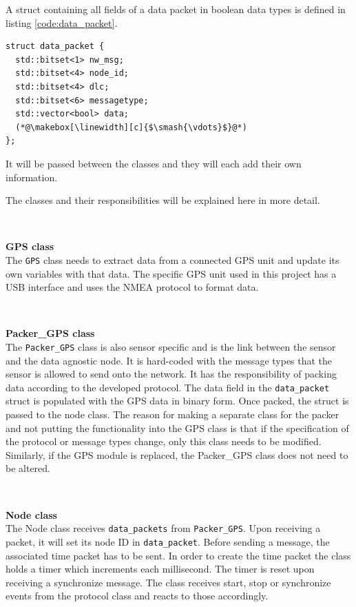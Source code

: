 A struct containing all fields of a data packet in boolean data types is defined in listing \ref{code:data_packet}.  

\begin{lstlisting}[caption=Struct for data packet.,label=code:data_packet]
struct data_packet {
  std::bitset<1> nw_msg;
  std::bitset<4> node_id;
  std::bitset<4> dlc;
  std::bitset<6> messagetype;
  std::vector<bool> data; 
  (*@\makebox[\linewidth][c]{$\smash{\vdots}$}@*)
};
\end{lstlisting}
It will be passed between the classes and they will each add their own information. 

The classes and their responsibilities will be explained here in more detail.

~\\ \par \textbf{GPS class} ~ \\
The \texttt{GPS} class needs to extract data from a connected GPS unit and update its own variables with that data.
The specific GPS unit used in this project has a USB interface and uses the NMEA protocol to format data.

~\\ \par \textbf{Packer\_GPS class} ~ \\
The \texttt{Packer\_GPS} class is also sensor specific and is the link between the sensor and the data agnostic node.
It is hard-coded with the message types that the sensor is allowed to send onto the network.
It has the responsibility of packing data according to the developed protocol.
The data field in the \texttt{data\_packet} struct is populated with the GPS data in binary form.
Once packed, the struct is passed to the node class.
The reason for making a separate class for the packer and not putting the functionality into the GPS class is that if the specification of the protocol or message types change, only this class needs to be modified.
Similarly, if the GPS module is replaced, the Packer\_GPS class does not need to be altered.

~\\ \par \textbf{Node class} ~ \\
The Node class receives \texttt{data\_packets} from \texttt{Packer\_GPS}.
Upon receiving a packet, it will set its node ID in \texttt{data\_packet}.
Before sending a message, the associated time packet has to be sent.
In order to create the time packet the class holds a timer which increments each millisecond.
The timer is reset upon receiving a synchronize message.
The class receives start, stop or synchronize events from the protocol class and reacts to those accordingly.

